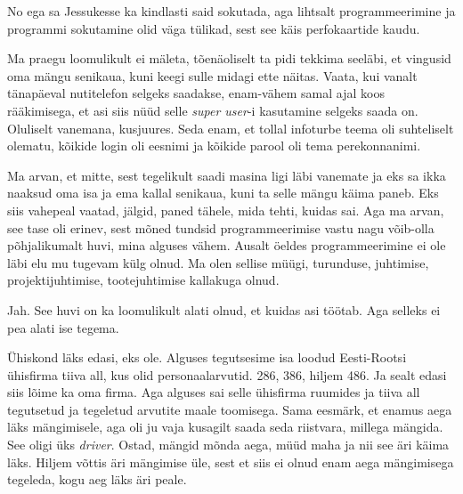 
No ega sa Jessukesse ka kindlasti said sokutada, aga lihtsalt  programmeerimine 
ja programmi sokutamine olid väga tülikad, sest see käis perfokaartide kaudu.
                 

Ma praegu loomulikult ei mäleta, tõenäoliselt ta pidi tekkima seeläbi, et 
vingusid oma mängu senikaua, kuni keegi sulle midagi ette näitas. Vaata, kui 
vanalt tänapäeval nutitelefon selgeks saadakse, enam-vähem samal ajal koos 
rääkimisega, et asi siis nüüd selle \emph{super user}-i kasutamine selgeks saada 
on. Oluliselt vanemana, kusjuures. Seda enam, et tollal  infoturbe teema oli 
suhteliselt olematu,  kõikide login oli eesnimi ja kõikide parool oli tema 
perekonnanimi.


Ma arvan, et mitte, sest tegelikult saadi masina ligi läbi vanemate ja eks sa 
ikka naaksud oma isa ja ema kallal senikaua, kuni ta selle mängu käima paneb. 
Eks siis vahepeal vaatad, jälgid, paned tähele, mida tehti, kuidas sai. Aga ma 
arvan, see tase oli erinev, sest mõned tundsid programmeerimise vastu nagu 
võib-olla põhjalikumalt huvi, mina  alguses vähem. Ausalt öeldes 
programmeerimine ei ole läbi elu mu tugevam külg olnud. Ma olen sellise müügi, 
turunduse, juhtimise, projektijuhtimise, tootejuhtimise kallakuga olnud.


Jah. See huvi on ka loomulikult alati olnud, et kuidas asi töötab. Aga selleks 
ei pea alati ise tegema.
                 

Ühiskond läks edasi, eks ole. Alguses tegutsesime  isa loodud Eesti-Rootsi 
ühisfirma tiiva all, kus olid personaalarvutid. 286, 386, hiljem 486. Ja sealt 
edasi siis lõime ka oma firma. Aga alguses sai selle ühisfirma ruumides ja tiiva 
all tegutsetud ja tegeletud arvutite maale toomisega. Sama eesmärk, et enamus 
aega läks mängimisele, aga oli ju vaja kusagilt saada seda riistvara, millega 
mängida. See oligi üks \emph{driver}. Ostad, mängid mõnda aega, müüd maha ja 
nii see äri käima läks. Hiljem võttis äri mängimise üle, sest et siis ei olnud 
enam aega mängimisega tegeleda, kogu aeg läks äri peale. 

